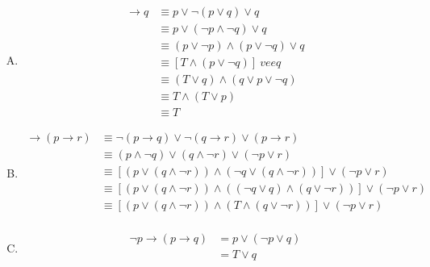 {{        %
        \begin{practices}
            \begin{enumerate}[A.]
                \item
                {
                    \begin{align*}
                        [\neg p \wedge (p \vee q)] \rightarrow q
                        &\equiv p \vee \neg (p \vee q) \vee q \\
                        &\equiv p \vee (\neg p \wedge \neg q) \vee q \\
                        &\equiv (p \vee \neg p) \wedge (p \vee \neg q) \vee q \\
                        &\equiv [T \wedge (p \vee \neg q)] \ vee q \\
                        &\equiv (T \vee q) \wedge (q \vee p \vee \neg q) \\
                        &\equiv T \wedge (T \vee p) \\
                        &\equiv T
                    \end{align*}
                }
                \item
                {
                    \begin{align*}
                        [(p \rightarrow q) \wedge (q \rightarrow r)] \rightarrow (p \rightarrow r)
                        &\equiv \neg (p \rightarrow q) \vee \neg (q \rightarrow r) \vee (p \rightarrow r) \\
                        &\equiv (p \wedge \neg q) \vee (q \wedge \neg r) \vee (\neg p \vee r) \\
                        &\equiv [(p \vee (q \wedge \neg r)) \wedge (\neg q \vee (q \wedge \neg r))] \vee (\neg p \vee r) \\
                        &\equiv [(p \vee (q \wedge \neg r)) \wedge ((\neg q \vee q) \wedge (q \vee \neg r))] \vee (\neg p \vee r) \\
                        &\equiv [(p \vee (q \wedge \neg r)) \wedge (T \wedge (q \vee \neg r))] \vee (\neg p \vee r) \\
                    \end{align*}
                }
                \item
                {
                    \begin{align*}
                        \neg p \rightarrow (p \rightarrow q) &= p \vee (\neg p \vee q) \\
                        &= T \vee q \\

\end{align*}}
\end{enumerate}
\end{practices}}}
